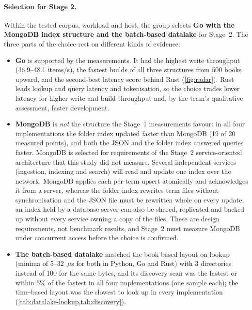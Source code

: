\paragraph{Selection for Stage 2.}
Within the tested corpus, workload and host, the group selects \textbf{Go
with the MongoDB index structure and the batch-based datalake} for Stage~2.
The three parts of the choice rest on different kinds of evidence:

\begin{itemize}
    \item \textbf{Go} is supported by the measurements. It had the highest
    write throughput (46.9--48.1 items/s), the fastest builds of all three
    structures from 500 books upward, and the second-best latency score
    behind Rust (\cref{fig:radar}). Rust leads lookup and query latency and
    tokenisation, so the choice trades lower latency for higher write and
    build throughput and, by the team's qualitative assessment, faster
    development.
    \item \textbf{MongoDB} is \emph{not} the structure the Stage~1
    measurements favour: in all four implementations the folder index
    updated faster than MongoDB (19 of 20 measured points), and both the JSON
    and the folder index answered queries faster. MongoDB is
    selected for requirements of the Stage~2 service-oriented architecture
    that this study did not measure. Several independent services
    (ingestion, indexing and search) will read and update one index over the
    network. MongoDB applies each per-term upsert atomically and
    acknowledges it from a server, whereas the folder index rewrites term
    files without synchronisation and the JSON file must be rewritten whole
    on every update; an index held by a database server can also be shared,
    replicated and backed up without every service owning a copy of the
    files. These are design requirements, not benchmark results, and Stage~2 must measure
    MongoDB under concurrent access before the choice is confirmed.
    \item \textbf{The batch-based datalake} matched the book-based layout on
    lookup (minima of 5--32~$\mu$s for both in Python, Go and Rust) with 3
    directories instead of 100 for the same bytes, and its discovery scan
    was the fastest or within 5\% of the fastest in all four
    implementations (one sample each); the
    time-based layout was the slowest to look up in every implementation
    (\cref{tab:datalake-lookup,tab:discovery}).
\end{itemize}

